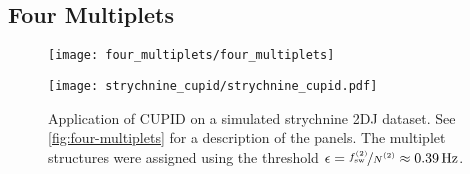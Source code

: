 \subsection{Four Multiplets}
\label{subsec:four-mp}
\begin{figure}
    \centering
    \texttt{[image: four\_multiplets/four\_multiplets]}
    \caption[
        The result of applying \acs{CUPID} to 5 instances of simulated
        \acs{2DJ} datasets with 4 heavily overlapping multiplet structures.
    ]{
        The result of applying \ac{CUPID} to 5 instances of simulated \ac{2DJ}
        datasets with 4 heavily overlapping multiplet structures.
        \textbf{a.} Black: pure shift spectrum generated by \ac{CUPID} (via the
        \ang{-45} signal).
        Grey: \ac{1D} spectrum simulated with \textsc{Spinach}, using the same spin
        system as was used to produce the \ac{2DJ} dataset, but with all scalar
        couplings set to \qty{0}{\hertz}. This has been offset slightly for
        clarity.
        \textbf{b.} \ac{1D} spectrum of the dataset, produced using the first
        direct-dimension \ac{FID} in the \ac{2DJ} dataset.
        \textbf{c.} Multiplet structures predicted, using a threshold $\epsilon
        = \nicefrac{\fswtwo}{\Ntwo} \approx \qty{0.98}{\hertz}$.
        \textbf{d.} Contour plot of the \ac{2DJ} spectrum in magnitude-mode,
        with coloured points denoting the frequencies of oscillators in the
        estimation result. The coloured vertical lines denote the predicted
        central frequencies of each multiplet structure.
    }
    \label{fig:four-multiplets}
    \vspace{20pt}
    \texttt{[image: strychnine\_cupid/strychnine\_cupid.pdf]}
    \caption[
        Application of \acs{CUPID} on a simulated strychnine \acs{2DJ} dataset.
    ]
    {
        Application of \ac{CUPID} on a simulated strychnine \ac{2DJ} dataset.
        See \cref{fig:four-multiplets} for a description of the panels.
        The multiplet structures were assigned using the threshold
        $\epsilon = \nicefrac{\fswtwo}{\Ntwo} \approx \qty{0.39}{\hertz}$.
    }
    \label{fig:strychnine-cupid}
\end{figure}

